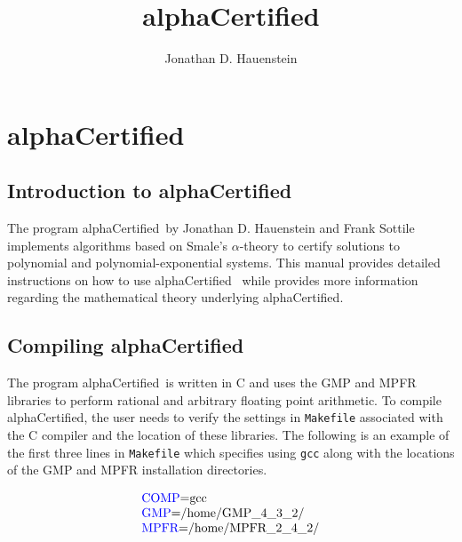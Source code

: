 \documentclass[11pt]{report}
\begin{document}
\newcommand{\bC}{{\mathbb C}}
\newcommand{\dhat}{{\hat d}}
\newcommand{\inputF}{{\tt input}}
\newcommand{\start}{{\tt start}}
\newcommand{\testPts}{{\tt test\_points}}
\newcommand{\outputF}{{\tt output}}
\newcommand{\localDim}{{\tt local\_dim}}
\newcommand{\alphaCertified}{{alphaCertified}}
\newcommand{\alphaCertifiedS}{{\alphaCertified~}}



\def\thesection{\arabic{section}}

\title{\alphaCertified}
\author{Jonathan D. Hauenstein}
\maketitle


\chapter*{\alphaCertified}

\section{Introduction to \alphaCertified}\label{CHAP:intro}

The program \alphaCertifiedS by Jonathan D. Hauenstein and Frank Sottile
implements algorithms based on Smale's $\alpha$-theory to
certify solutions to polynomial and polynomial-exponential systems.
This manual provides detailed instructions on how to use \alphaCertifiedS
while \cite{HS10,HL11} provides more information regarding the mathematical
theory underlying \alphaCertified.

\section{Compiling \alphaCertified}\label{CHAP:compile}

The program \alphaCertifiedS is written in C and uses the GMP\cite{GMP} and MPFR\cite{MPFR} libraries
to perform rational and arbitrary floating point arithmetic.
To compile \alphaCertified, the user needs to verify the settings in {\tt Makefile}
associated with the C compiler and the location of these libraries.
The following is an example of the first three lines in {\tt Makefile}
which specifies using {\tt gcc} along with the
locations of the GMP and MPFR installation directories.

$$\begin{array}{l}
\hbox{\begin{color}{blue}COMP\end{color}=gcc} \\
\hbox{\begin{color}{blue}GMP\end{color}=/home/GMP\_4\_3\_2/} \\
\hbox{\begin{color}{blue}MPFR\end{color}=/home/MPFR\_2\_4\_2/}
\end{array}$$
\end{document}
